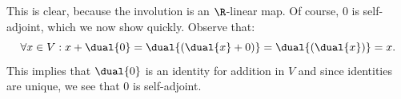 %
%
\label {sol: self adjoint part of a star vector space is a real vector space}This is clear, because the involution is an $\R$-linear map. Of course, $0$ is self-adjoint, which we now show quickly. Observe that:
\[\forall x \in V: x+\dual{0} = \dual{(\dual{x}+0)} = \dual{(\dual{x})} = x.\]
This implies that $\dual{0}$ is an identity for addition in $V$ and since identities are unique, we see that $0$ is self-adjoint.
